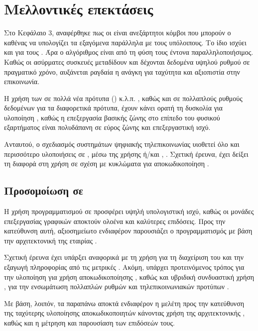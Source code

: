 \chapter{Mελλοντικές επεκτάσεις}
Στο Κεφάλαιο 3, αναφέρθηκε πως οι  είναι ανεξάρτητοι κόμβοι που μπορούν ο καθένας να υπολογίζει τα εξαγόμενα  παράλληλα με τους υπόλοιπους. Το ίδιο ισχύει και για τους . Άρα ο αλγόριθμος  είναι από τη φύση τους έντονα παραλληλοποιήσιμος. Καθώς οι ασύρματες συσκευές μεταδίδουν και δέχονται δεδομένα υψηλού ρυθμού σε πραγματικό χρόνο, αυξάνεται ραγδαία η ανάγκη για ταχύτητα και αξιοπιστία στην επικοινωνία.

Η χρήση των  σε πολλά νέα πρότυπα ()  κ.λ.π. \cite{falcao2011massively}, καθώς και σε πολλαπλούς ρυθμούς δεδομένων για τα διαφορετικά πρότυπα, έχουν κάνει ορατή τη δυσκολία για υλοποίηση , καθώς η επεξεργασία βασικής ζώνης στο επίπεδο του φυσικού εξαρτήματος είναι πολυδάπανη σε εύρος ζώνης και επεξεργαστική ισχύ. 

Αντ\textquotesingle αυτού, ο σχεδιασμός συστημάτων ψηφιακής τηλεπικοινωνίας υιοθετεί όλο και περισσότερο υλοποιήσεις σε , μέσω της χρήσης  ή/και  \cite{park2011parallel}, \cite{abburi2011scalable}. Σχετική έρευνα, έχει δείξει τη διαφορά στη χρήση  σε σχέση με κυκλώματα  για  αποκωδικοποίηση \cite{falcao2009gpus}.

\section{Προσομοίωση σε }

Η χρήση προγραμματισμού σε  προσφέρει υψηλή υπολογιστική ισχύ, καθώς οι μονάδες επεξεργασίας γραφικών αποκτούν ολοένα και καλύτερες επιδόσεις. Προς την κατεύθυνση αυτή, αξιοσημείωτο ενδιαφέρον παρουσιάζει ο προγραμματισμός με βάση την αρχιτεκτονική  της εταιρίας .

Σχετική έρευνα έχει υπάρξει αναφορικά με τη χρήση  για τη διαχείριση του  και την εξαγωγή πληροφορίας από τις μετρικές  \cite{falcao2009parallel}. Ακόμη, υπάρχει προτεινόμενος τρόπος για την υλοποίηση  για χρήση  αποκωδικοποίησης \cite{falcao2011massively}, καθώς και υβριδική συνδυαστική χρήση , για την ενσωμάτωση πολλαπλών ρυθμών και τηλεπικοινωνιακών προτύπων \cite{park2011parallel}.

Με βάση, λοιπόν, τα παραπάνω αποκτά ενδιαφέρον η μελέτη προς την κατεύθυνση της ταχύτερης υλοποίησης  αποκωδικοποιητών κάνοντας χρήση της αρχιτεκτονικής , καθώς και η μέτρηση και παρουσίαση των επιδόσεών τους.
